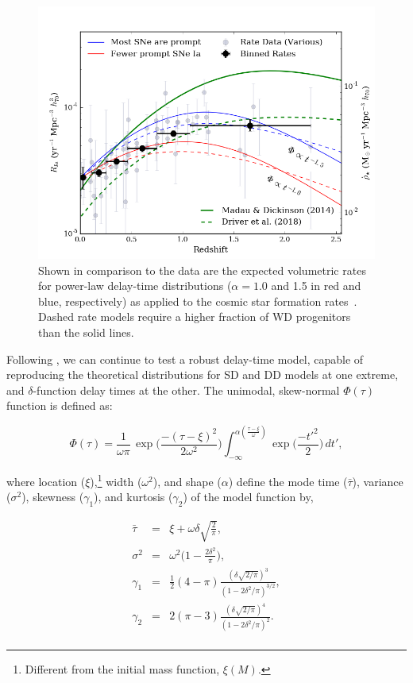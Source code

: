 \documentclass[apj]{aastex}
\begin{document}
\begin{figure}[t]
   \centering
   \includegraphics[width=6.1in]{figure_SNIa_rate_alpha}
   \caption{\footnotesize Shown in comparison to the data are the expected volumetric rates for power-law delay-time distributions ($\alpha = 1.0$ and 1.5 in red and blue, respectively) as applied to the cosmic star formation rates~\cite[in  solid and dashed green, respectively]{Madau:2014fk,Driver:2018nr}. Dashed rate models require a higher fraction of WD progenitors than the solid lines.}
   \label{fig:sn1a_rates2}
\end{figure}

Following \cite{Strolger:2010}, we can continue to test a robust delay-time model, capable of reproducing the theoretical distributions for SD and DD models at one extreme, and $\delta$-function delay times at the other. The unimodal, skew-normal $\Phi(\tau)$ function is defined as:

\begin{equation}
	\Phi(\tau)=\frac{1}{\omega\pi}\,\exp\biggl(\frac{-(\tau-\xi)^2}{2\omega^2}\biggr)\int_{-\infty}^{\alpha (\frac{\tau-\xi}{\omega})} \exp\biggl(\frac{-t'^2}{2}\biggr)\,dt',
\label{eqn:model}
\end{equation}

\noindent where location ($\xi$),\footnote{Different from the initial mass function, $\xi(M)$.} width ($\omega^2$), and shape ($\alpha$) define the mode time ($\bar{\tau}$), variance ($\sigma^2$), skewness ($\gamma_1$), and kurtosis ($\gamma_2$) of the model function by,

\begin{eqnarray*}
\bar{\tau}&=&\xi+\omega\delta\sqrt{\frac{2}{\pi}},\\
\sigma^2&=&\omega^2\biggl(1-\frac{2\delta^2}{\pi}\biggr),\\
\gamma_1&=&\frac{1}{2}(4-\pi)\frac{(\delta\sqrt{2/\pi})^3}{(1-2\delta^2/\pi)^{3/2}},\\
\gamma_2&=&2(\pi-3)\frac{(\delta\sqrt{2/\pi})^4}{(1-2\delta^2/\pi)^{2}}.\\
\end{eqnarray*}
\end{document}
